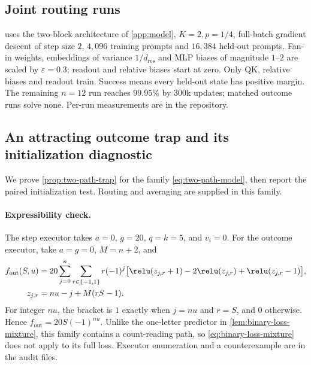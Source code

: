 \subsection{Joint routing runs}
\label{app:reach}

 uses the two-block architecture of \cref{app:model}, $K=2,p=1/4$,
full-batch gradient descent of step size $2$, $4{,}096$ training prompts and $16{,}384$
held-out prompts. Fan-in weights, embeddings of variance $1/d_{\mathrm{res}}$ and
MLP biases of magnitude $1$--$2$ are scaled by $\varepsilon=0.3$; readout and relative
biases start at zero. Only QK, relative biases and readout train. Success means every
held-out state has positive margin. The remaining $n=12$ run reaches $99.95\%$ by
$300$k updates; matched outcome runs solve none. Per-run measurements are in the repository.

\subsection{An attracting outcome trap and its initialization diagnostic}
\label{app:two-path}
We prove \cref{prop:two-path-trap} for the family \cref{eq:two-path-model}, then
report the paired initialization test. Routing and averaging are supplied in this family.

\paragraph{Expressibility check.}
The step executor takes $a=0$, $g=20$, $q=k=5$, and $v_i=0$.
For the outcome executor, take $a=g=0$, $M=n+2$, and
\[
\begin{aligned}
 f_{\mathrm{out}}(S,u)&=20\sum_{j=0}^n\sum_{r\in\{-1,1\}}r(-1)^j
 \bigl[\relu(z_{j,r}+1)-2\relu(z_{j,r})+\relu(z_{j,r}-1)\bigr],\\
 z_{j,r}&=nu-j+M(rS-1).
\end{aligned}
\]
For integer $nu$, the bracket is $1$ exactly when $j=nu$ and $r=S$, and
$0$ otherwise. Hence $f_{\mathrm{out}}=20S(-1)^{nu}$.
Unlike the one-letter predictor in \cref{lem:binary-loss-mixture}, this family
contains a count-reading path, so \cref{eq:binary-loss-mixture} does not apply to
its full loss. Executor enumeration and a counterexample are in the audit files.

